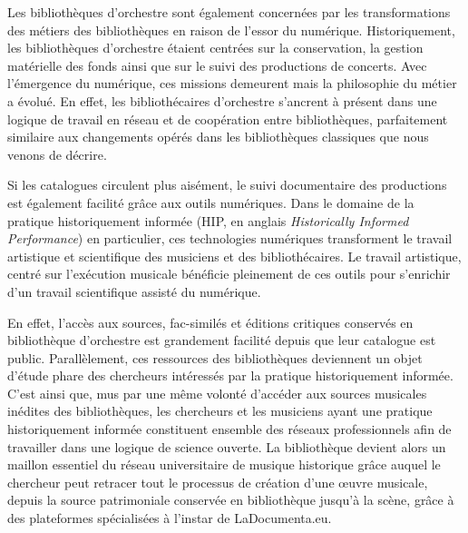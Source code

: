 Les bibliothèques d’orchestre sont également concernées par les transformations des métiers des bibliothèques en raison de l’essor du numérique.
Historiquement, les bibliothèques d’orchestre étaient centrées sur la conservation, la gestion matérielle des fonds ainsi que sur le suivi des productions de concerts. Avec l’émergence du numérique, ces missions demeurent mais la philosophie du métier a évolué. En effet, les bibliothécaires d’orchestre s’ancrent à présent dans une logique de travail en réseau et de coopération entre bibliothèques, parfaitement similaire aux changements opérés dans les bibliothèques classiques que nous venons de décrire. 

Si les catalogues circulent plus aisément, le suivi documentaire des productions est également facilité grâce aux outils numériques. 
Dans le domaine de la pratique historiquement informée (HIP, en anglais \textit{Historically Informed Performance}) en particulier, ces technologies numériques transforment le travail artistique et scientifique des musiciens et des bibliothécaires. Le travail artistique, centré sur l’exécution musicale bénéficie pleinement de ces outils pour s’enrichir d’un travail scientifique assisté du numérique. 

En effet, l’accès aux sources, fac-similés et éditions critiques conservés en bibliothèque d’orchestre est grandement facilité depuis que leur catalogue est public. Parallèlement, ces ressources des bibliothèques deviennent un objet d’étude phare des chercheurs intéressés par la pratique historiquement informée. C’est ainsi que, mus par une même volonté d’accéder aux sources musicales inédites des bibliothèques, les chercheurs et les musiciens ayant une pratique historiquement informée constituent ensemble des réseaux professionnels afin de travailler dans une logique de science ouverte. La bibliothèque devient alors un maillon essentiel du réseau universitaire de musique historique grâce auquel le chercheur peut retracer tout le processus de création d’une œuvre musicale, depuis la source patrimoniale conservée en bibliothèque jusqu’à la scène, grâce à des plateformes spécialisées à l'instar de LaDocumenta.eu. 



